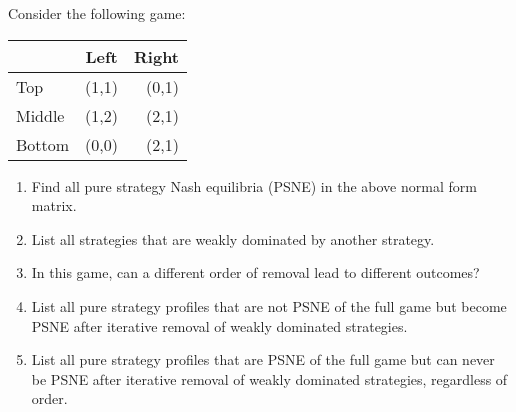 \documentclass[../main.tex]{subfiles}
\begin{document}
\begin{question}
    Consider the following game:
    
    \begin{center}
	    \begin{tabular}{|l|c|r|}
	    \hline
	    & Left & Right \\
	    \hline
	    Top & (1,1) & (0,1) \\
	    \hline
	    Middle & (1,2) & (2,1) \\
	    \hline
	    Bottom & (0,0) & (2,1) \\
	    \hline
	    \end{tabular}
    \end{center}
    
    \begin{enumerate}
    	\item Find all pure strategy Nash equilibria (PSNE) in the above normal form matrix.
    	\item List all strategies that are weakly dominated by another strategy.
    	\item In this game, can a different order of removal lead to different outcomes?
    	\item List all pure strategy profiles that are not PSNE of the full game but become PSNE after iterative removal of weakly dominated strategies.
    	\item List all pure strategy profiles that are PSNE of the full game but can never be PSNE after iterative removal of weakly dominated strategies, regardless of order.
    \end{enumerate}
   
\end{question}
\end{document}
